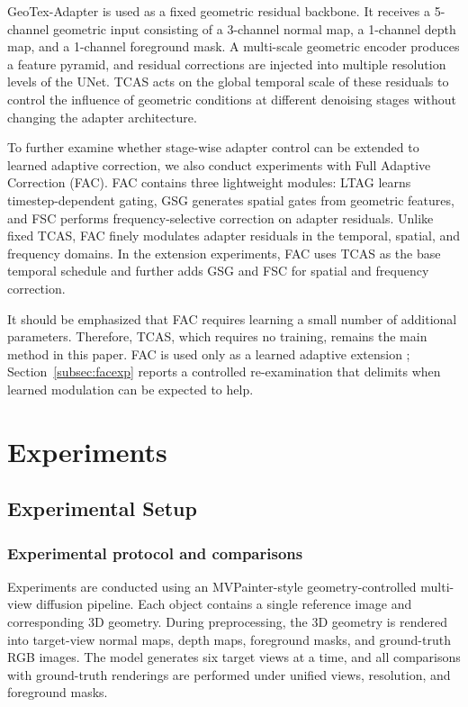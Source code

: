 \documentclass[times,twocolumn,final]{elsarticle}
\providecommand{\DIFadd}[1]{{\protect\color{blue} \sf #1}} %
\providecommand{\DIFaddbegin}{} %
\providecommand{\DIFaddend}{} %
\newcommand{\DIFaddincludegraphics}[2][]{{\color{blue}\fbox{\DIFOincludegraphics[#1]{#2}}}} %
\DeclareRobustCommand{\DIFaddbegin}{\DIFOaddbegin \let\includegraphics\DIFaddincludegraphics} %
\DeclareRobustCommand{\DIFaddend}{\DIFOaddend \let\includegraphics\DIFOincludegraphics} %
\begin{document}
GeoTex-Adapter is used as a fixed geometric residual backbone. It receives a 5-channel geometric input consisting of a 3-channel normal map, a 1-channel depth map, and a 1-channel foreground mask. A multi-scale geometric encoder produces a feature pyramid, and residual corrections are injected into multiple resolution levels of the UNet. TCAS acts on the global temporal scale of these residuals to control the influence of geometric conditions at different denoising stages without changing the adapter architecture.

To further examine whether stage-wise adapter control can be extended to learned adaptive correction, we also conduct experiments with Full Adaptive Correction (FAC). FAC contains three lightweight modules: LTAG learns timestep-dependent gating, GSG generates spatial gates from geometric features, and FSC performs frequency-selective correction on adapter residuals. Unlike fixed TCAS, FAC finely modulates adapter residuals in the temporal, spatial, and frequency domains. In the extension experiments, FAC uses TCAS as the base temporal schedule and further adds GSG and FSC for spatial and frequency correction.

It should be emphasized that FAC requires learning a small number of additional parameters. Therefore, TCAS, which requires no training, remains the main method in this paper. FAC is used only as a learned adaptive extension  \DIFaddbegin \DIFadd{; Section~\ref{subsec:facexp} reports a controlled re-examination that delimits when learned modulation can be expected to help}\DIFaddend .

\section{Experiments}
\label{sec:experiments}

\subsection{Experimental Setup}
\label{subsec:setup}

\DIFaddbegin \subsubsection{\DIFadd{Experimental protocol and comparisons}}

\DIFaddend Experiments are conducted using an MVPainter-style geometry-controlled multi-view diffusion pipeline. Each object contains a single reference image and corresponding 3D geometry. During preprocessing, the 3D geometry is rendered into target-view normal maps, depth maps, foreground masks, and ground-truth RGB images. The model generates six target views at a time, and all comparisons with ground-truth renderings are performed under unified views, resolution, and foreground masks.
\end{document}
